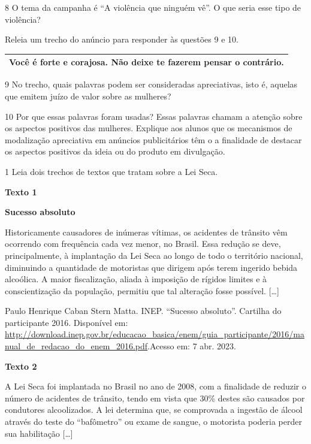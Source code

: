 \begin{itemize}
\begin{itemize}
{\begin{itemize}
\begin{itemize}
\num{8} O tema da campanha é ``A violência que ninguém vê''. O que seria
esse tipo de violência? 

Releia um trecho do anúncio para responder às questões 9 e 10.

\begin{longtable}[]{@{}l@{}}
\toprule
Você é forte e corajosa. Não deixe te fazerem pensar o
contrário.\tabularnewline
\bottomrule
\end{longtable}

\num{9} No trecho, quais palavras podem ser consideradas apreciativas,
isto é, aquelas que emitem juízo de valor sobre as mulheres? 

\num{10} Por que essas palavras foram usadas?  Essas palavras
chamam a atenção sobre os aspectos positivos das mulheres. Explique aos
alunos que os mecanismos de modalização apreciativa em anúncios
publicitários têm o a finalidade de destacar os aspectos positivos da
ideia ou do produto em divulgação.


\num{1} Leia dois trechos de textos que tratam sobre a Lei Seca.

\textbf{Texto 1}

\textbf{Sucesso absoluto}

Historicamente causadores de inúmeras vítimas, os acidentes de trânsito
vêm ocorrendo com frequência cada vez menor, no Brasil. Essa redução se
deve, principalmente, à implantação da Lei Seca ao longo de todo o
território nacional, diminuindo a quantidade de motoristas que dirigem
após terem ingerido bebida alcoólica. A maior fiscalização, aliada à
imposição de rígidos limites e à conscientização da população, permitiu
que tal alteração fosse possível. {[}\ldots{}{]}

Paulo Henrique Caban Stern Matta. INEP. ``Sucesso absoluto''. Cartilha
do participante 2016. Disponível em:
\url{http://download.inep.gov.br/educacao_basica/enem/guia_participante/2016/manual_de_redacao_do_enem_2016.pdf}.Acesso
em: 7 abr. 2023.

\textbf{Texto 2}

A Lei Seca foi implantada no Brasil no ano de 2008, com a finalidade de
reduzir o número de acidentes de trânsito, tendo em vista que 30\%
destes são causados por condutores alcoolizados. A lei determina que, se
comprovada a ingestão de álcool através do teste do ``bafômetro'' ou
exame de sangue, o motorista poderia perder sua habilitação
{[}\ldots{}{]}


\end{itemize}
\end{itemize}}
\end{itemize}
\end{itemize}
